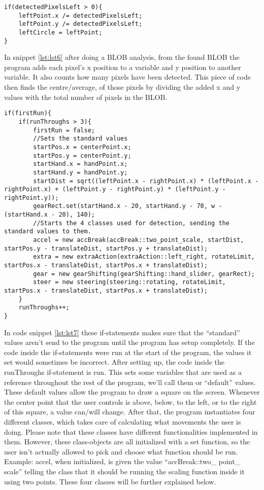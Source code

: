 \begin{lstlisting}[caption=Post BLOB analysis, label=lst:lst6]
if(detectedPixelsLeft > 0){
    leftPoint.x /= detectedPixelsLeft;
    leftPoint.y /= detectedPixelsLeft;
    leftCircle = leftPoint;
}
\end{lstlisting}

In snippet \ref{lst:lst6} after doing a BLOB analysis, from the found BLOB the program adds each pixel’s x position to a variable and y position to another variable. 
It also counts how many pixels have been detected. 
This piece of code then finds the centre/average, of those pixels by dividing the added x and y values with the total number of pixels in the BLOB.
\bigskip

\pagebreak[4]
\begin{lstlisting}[caption=Update, label=lst:lst7]
if(firstRun){
    if(runThroughs > 3){
        firstRun = false;
        //Sets the standard values
        startPos.x = centerPoint.x;
        startPos.y = centerPoint.y;
        startHand.x = handPoint.x;
        startHand.y = handPoint.y;
        startDist = sqrt((leftPoint.x - rightPoint.x) * (leftPoint.x - rightPoint.x) + (leftPoint.y - rightPoint.y) * (leftPoint.y - rightPoint.y));
        gearRect.set(startHand.x - 20, startHand.y - 70, w - (startHand.x - 20), 140);
        //Starts the 4 classes used for detection, sending the standard values to them.
        accel = new accBreak(accBreak::two_point_scale, startDist, startPos.y - translateDist, startPos.y + translateDist);
        extra = new extraAction(extraAction::left_right, rotateLimit, startPos.x - translateDist, startPos.x + translateDist);
        gear = new gearShifting(gearShifting::hand_slider, gearRect);
        steer = new steering(steering::rotating, rotateLimit, startPos.x - translateDist, startPos.x + translateDist);
    }
    runThroughs++;
}
\end{lstlisting}

In code snippet \ref{lst:lst7} these if-statements makes sure that the “standard” values aren’t send to the program until the program has setup completely. 
If the code inside the if-statements were run at the start of the program, the values it set would sometimes be incorrect. 
After setting up, the code inside the runThroughs if-statement is run. 
This sets some variables that are used as a reference throughout the rest of the program, we’ll call them or “default” values. 
These default values allow the program to draw a square on the screen. Whenever the center point that the user controls is above, below, to the left, or to the right of this square, a value can/will change. 
After that, the program instantiates four different classes, which takes care of calculating what movements the user is doing. 
Please note that these classes have different functionalities implemented in them. 
However, these class-objects are all initialized with a set function, so the user isn’t actually allowed to pick and choose what function should be run. 
Example: accel, when initialized, is given the value “accBreak::two\_ point\_ scale” telling the class that it should be running the scaling function inside it using two points.
These four classes will be further explained below.

